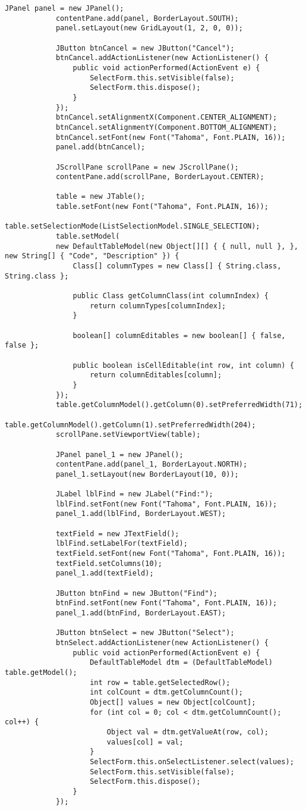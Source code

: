 \begin{lstlisting}[style=JavaStyle]
			JPanel panel = new JPanel();
			contentPane.add(panel, BorderLayout.SOUTH);
			panel.setLayout(new GridLayout(1, 2, 0, 0));
			
			JButton btnCancel = new JButton("Cancel");
			btnCancel.addActionListener(new ActionListener() {
				public void actionPerformed(ActionEvent e) {
					SelectForm.this.setVisible(false);
					SelectForm.this.dispose();
				}
			});
			btnCancel.setAlignmentX(Component.CENTER_ALIGNMENT);
			btnCancel.setAlignmentY(Component.BOTTOM_ALIGNMENT);
			btnCancel.setFont(new Font("Tahoma", Font.PLAIN, 16));
			panel.add(btnCancel);
			
			JScrollPane scrollPane = new JScrollPane();
			contentPane.add(scrollPane, BorderLayout.CENTER);
			
			table = new JTable();
			table.setFont(new Font("Tahoma", Font.PLAIN, 16));
			table.setSelectionMode(ListSelectionModel.SINGLE_SELECTION);
			table.setModel(
			new DefaultTableModel(new Object[][] { { null, null }, }, new String[] { "Code", "Description" }) {
				Class[] columnTypes = new Class[] { String.class, String.class };
				
				public Class getColumnClass(int columnIndex) {
					return columnTypes[columnIndex];
				}
				
				boolean[] columnEditables = new boolean[] { false, false };
				
				public boolean isCellEditable(int row, int column) {
					return columnEditables[column];
				}
			});
			table.getColumnModel().getColumn(0).setPreferredWidth(71);
			table.getColumnModel().getColumn(1).setPreferredWidth(204);
			scrollPane.setViewportView(table);
			
			JPanel panel_1 = new JPanel();
			contentPane.add(panel_1, BorderLayout.NORTH);
			panel_1.setLayout(new BorderLayout(10, 0));
			
			JLabel lblFind = new JLabel("Find:");
			lblFind.setFont(new Font("Tahoma", Font.PLAIN, 16));
			panel_1.add(lblFind, BorderLayout.WEST);
			
			textField = new JTextField();
			lblFind.setLabelFor(textField);
			textField.setFont(new Font("Tahoma", Font.PLAIN, 16));
			textField.setColumns(10);
			panel_1.add(textField);
			
			JButton btnFind = new JButton("Find");
			btnFind.setFont(new Font("Tahoma", Font.PLAIN, 16));
			panel_1.add(btnFind, BorderLayout.EAST);
			
			JButton btnSelect = new JButton("Select");
			btnSelect.addActionListener(new ActionListener() {
				public void actionPerformed(ActionEvent e) {
					DefaultTableModel dtm = (DefaultTableModel) table.getModel();
					int row = table.getSelectedRow();
					int colCount = dtm.getColumnCount();
					Object[] values = new Object[colCount];
					for (int col = 0; col < dtm.getColumnCount(); col++) {
						Object val = dtm.getValueAt(row, col);
						values[col] = val;
					}
					SelectForm.this.onSelectListener.select(values);
					SelectForm.this.setVisible(false);
					SelectForm.this.dispose();
				}
			});
			

\end{lstlisting}
